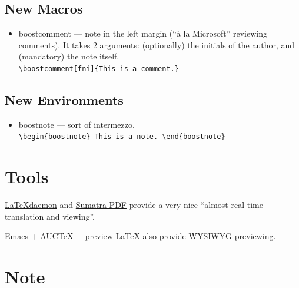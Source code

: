 \documentclass{boostreport}
\begin{document}
\subsection{New Macros}
\label{sec:macros}

\begin{itemize}
    \item boostcomment --- note in the left margin (``à la Microsoft''
    reviewing comments). It takes 2 arguments: (optionally) the initials of
    the author, and (mandatory) the note
    itself. \\
    \verb|\boostcomment[fni]{This is a comment.}|
\end{itemize}

\subsection{New Environments}
\label{sec:environments}

\begin{itemize}
    \item boostnote --- sort of intermezzo. \\
    \verb|\begin{boostnote} This is a note. \end{boostnote}|
\end{itemize}

% 
% 


\section{Tools}
\label{sec:tools}

\href{http://code.google.com/p/latexdaemon/}{LaTeXdaemon} and
\href{http://blog.kowalczyk.info/software/sumatrapdf/}{Sumatra PDF} provide
a very nice ``almost real time translation and viewing''.

Emacs + AUCTeX +
\href{http://www.gnu.org/software/auctex/preview-latex.html}{preview-LaTeX}
also provide \acs{WYSIWYG} previewing.


\section{Note}
\label{sec:note}
\end{document}
